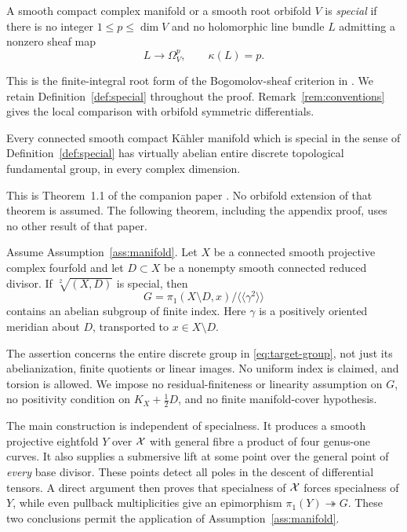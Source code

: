 \begin{definition}\label{def:special}
A smooth compact complex manifold or a smooth root orbifold $V$ is \emph{special} if there is no integer $1\le p\le\dim V$ and no holomorphic line bundle $L$ admitting a nonzero sheaf map
\[
 L\longrightarrow\Omega_V^p,\qquad \kappa(L)=p.
\]
\end{definition}

This is the finite-integral root form of the Bogomolov-sheaf criterion in \cite[Theorem~8.9]{CampanaOrbifolds}. We retain Definition~\ref{def:special} throughout the proof. Remark~\ref{rem:conventions} gives the local comparison with orbifold symmetric differentials.

\begin{assumption}\label{ass:manifold}
Every connected smooth compact K\"ahler manifold which is special in the sense of Definition~\ref{def:special} has virtually abelian entire discrete topological fundamental group, in every complex dimension.
\end{assumption}

This is Theorem~1.1 of the companion paper \cite{Supplied}. No orbifold extension of that theorem is assumed. The following theorem, including the appendix proof, uses no other result of that paper.

\begin{theorem}\label{thm:main}
Assume Assumption~\ref{ass:manifold}. Let $X$ be a connected smooth projective complex fourfold and let $D\subset X$ be a nonempty smooth connected reduced divisor. If $\sqrt[2]{(X,D)}$ is special, then
\begin{equation}\label{eq:target-group}
 G=\pi_1(X\setminus D,x)\big/\langle\!\langle\gamma^2\rangle\!\rangle
\end{equation}
contains an abelian subgroup of finite index. Here $\gamma$ is a positively oriented meridian about $D$, transported to $x\in X\setminus D$.
\end{theorem}

The assertion concerns the entire discrete group in \eqref{eq:target-group}, not just its abelianization, finite quotients or linear images. No uniform index is claimed, and torsion is allowed. We impose no residual-finiteness or linearity assumption on $G$, no positivity condition on $K_X+\tfrac12D$, and no finite manifold-cover hypothesis.

The main construction is independent of specialness. It produces a smooth projective eightfold $Y$ over $\mathcal X$ with general fibre a product of four genus-one curves. It also supplies a submersive lift at some point over the general point of \emph{every} base divisor. These points detect all poles in the descent of differential tensors. A direct argument then proves that specialness of $\mathcal X$ forces specialness of $Y$, while even pullback multiplicities give an epimorphism $\pi_1(Y)\twoheadrightarrow G$. These two conclusions permit the application of Assumption~\ref{ass:manifold}.

